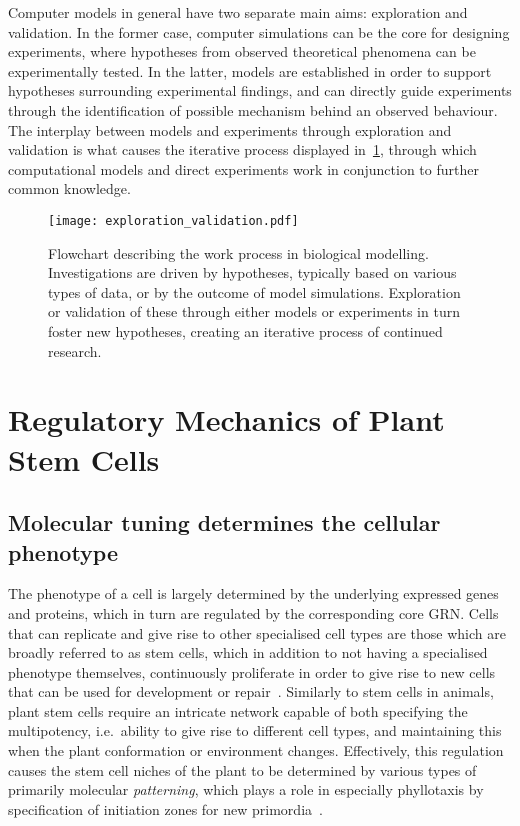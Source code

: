 Computer models in general have two separate main aims: exploration and validation.
In the former case, computer simulations can be the core for designing
experiments, where hypotheses from observed theoretical phenomena
can be experimentally tested. In the latter, models are established in order to
support hypotheses surrounding experimental findings, and can directly guide
experiments through the identification of possible mechanism behind an observed
behaviour. The interplay between models and experiments through exploration and
validation is what causes the iterative process displayed in~\cref{fig:expl_val},
through which computational models and direct experiments work in conjunction to further
common knowledge.
\begin{figure}[H]
  \centering
  \texttt{[image: exploration\_validation.pdf]}
  \caption[Modelling biological systems: an illustration]{Flowchart describing
    the work process in biological modelling. Investigations are driven by
    hypotheses, typically based on various types of data, or by the outcome of
    model simulations. Exploration or validation of these through either
    models or experiments in turn foster new hypotheses, creating an iterative
    process of continued research.}  
  \label{fig:expl_val}
\end{figure}

\section{Regulatory Mechanics of Plant Stem Cells} %
\subsection{Molecular tuning determines the cellular phenotype} %
The phenotype of a cell is largely determined by the underlying
expressed genes and proteins, which in turn are regulated by the corresponding core GRN. Cells
that can replicate and give rise to other specialised cell types are those which
are broadly referred to as stem cells, which in addition to not having a specialised
phenotype themselves, continuously proliferate in order to give rise to new cells that can
be used for development or repair~\cite{clark2001cell}.
Similarly to stem cells in animals, plant stem cells require an intricate
network capable of both
specifying the multipotency, i.e.\ ability to give rise to different cell types,
and maintaining this when the plant 
conformation or environment changes. Effectively, this regulation causes the
stem cell niches of the plant to be determined by various types of primarily
molecular \textit{patterning}, which plays a role in especially phyllotaxis  by
specification of initiation zones for new primordia~\cite{reinhardt2003regulation}.


